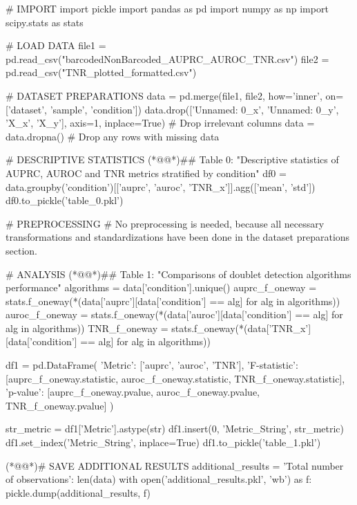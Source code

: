 \documentclass[11pt]{article}
\begin{document}
\begin{python}

# IMPORT
import pickle
import pandas as pd
import numpy as np
import scipy.stats as stats

# LOAD DATA
file1 = pd.read_csv("barcodedNonBarcoded_AUPRC_AUROC_TNR.csv")
file2 = pd.read_csv("TNR_plotted_formatted.csv")

# DATASET PREPARATIONS
data = pd.merge(file1, file2, how='inner', on=['dataset', 'sample', 'condition'])
data.drop(['Unnamed: 0_x', 'Unnamed: 0_y', 'X_x', 'X_y'], axis=1, inplace=True)  # Drop irrelevant columns
data = data.dropna()  # Drop any rows with missing data

# DESCRIPTIVE STATISTICS
(*@@*)## Table 0: "Descriptive statistics of AUPRC, AUROC and TNR metrics stratified by condition"
df0 = data.groupby('condition')[['auprc', 'auroc', 'TNR_x']].agg(['mean', 'std'])
df0.to_pickle('table_0.pkl')

# PREPROCESSING
# No preprocessing is needed, because all necessary transformations and standardizations have been done in the dataset preparations section.

# ANALYSIS
(*@@*)## Table 1: "Comparisons of doublet detection algorithms performance"
algorithms = data['condition'].unique()
auprc_f_oneway = stats.f_oneway(*(data['auprc'][data['condition'] == alg] for alg in algorithms))
auroc_f_oneway = stats.f_oneway(*(data['auroc'][data['condition'] == alg] for alg in algorithms))
TNR_f_oneway = stats.f_oneway(*(data['TNR_x'][data['condition'] == alg] for alg in algorithms))

df1 = pd.DataFrame({
    'Metric': ['auprc', 'auroc', 'TNR'],
    'F-statistic': [auprc_f_oneway.statistic, auroc_f_oneway.statistic, TNR_f_oneway.statistic],
    'p-value': [auprc_f_oneway.pvalue, auroc_f_oneway.pvalue, TNR_f_oneway.pvalue]
    })

str_metric = df1['Metric'].astype(str)
df1.insert(0, 'Metric_String', str_metric)
df1.set_index('Metric_String', inplace=True)
df1.to_pickle('table_1.pkl')

(*@@*)# SAVE ADDITIONAL RESULTS
additional_results = {
    'Total number of observations': len(data)
}
with open('additional_results.pkl', 'wb') as f:
    pickle.dump(additional_results, f)

\end{python}
\end{document}
